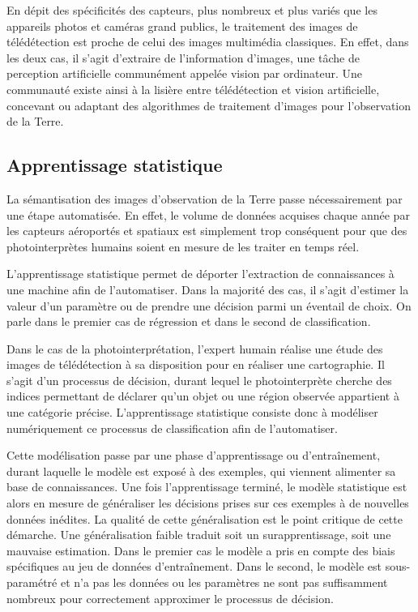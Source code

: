En dépit des spécificités des capteurs, plus nombreux et plus variés que les appareils photos et caméras grand publics, le traitement des images de télédétection est proche de celui des images multimédia classiques. En effet, dans les deux cas, il s'agit d'extraire de l'information d'images, une tâche de perception artificielle communément appelée vision par ordinateur. Une communauté existe ainsi à la lisière entre télédétection et vision artificielle, concevant ou adaptant des algorithmes de traitement d'images pour l'observation de la Terre.

\subsection{Apprentissage statistique}

La sémantisation des images d'observation de la Terre passe nécessairement par une étape automatisée. En effet, le volume de données acquises chaque année par les capteurs aéroportés et spatiaux est simplement trop conséquent pour que des photointerprètes humains soient en mesure de les traiter en temps réel.

L'apprentissage statistique permet de déporter l'extraction de connaissances à une machine afin de l'automatiser. Dans la majorité des cas, il s'agit d'estimer la valeur d'un paramètre ou de prendre une décision parmi un éventail de choix. On parle dans le premier cas de régression et dans le second de classification.

Dans le cas de la photointerprétation, l'expert humain réalise une étude des images de télédétection à sa disposition pour en réaliser une cartographie. Il s'agit d'un processus de décision, durant lequel le photointerprète cherche des indices permettant de déclarer qu'un objet ou une région observée appartient à une catégorie précise. L'apprentissage statistique consiste donc à modéliser numériquement ce processus de classification afin de l'automatiser.

Cette modélisation passe par une phase d'apprentissage ou d'entraînement, durant laquelle le modèle est exposé à des exemples, qui viennent alimenter sa base de connaissances. Une fois l'apprentissage terminé, le modèle statistique est alors en mesure de généraliser les décisions prises sur ces exemples à de nouvelles données inédites. La qualité de cette généralisation est le point critique de cette démarche. Une généralisation faible traduit soit un surapprentissage, soit une mauvaise estimation. Dans le premier cas le modèle a pris en compte des biais spécifiques au jeu de données d'entraînement. Dans le second, le modèle est sous-paramétré et n'a pas les données ou les paramètres ne sont pas suffisamment nombreux pour correctement approximer le processus de décision.

